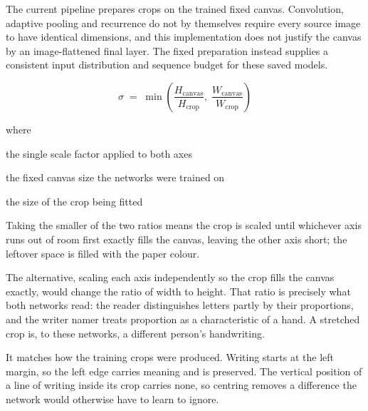 The current pipeline prepares crops on the trained fixed canvas. Convolution, adaptive pooling and recurrence do not by themselves require every source image to have identical dimensions, and this implementation does not justify the canvas by an image-flattened final layer. The fixed preparation instead supplies a consistent input distribution and sequence budget for these saved models.



\begin{equation}
\sigma \;=\; \min\!\left(\frac{H_{\mathrm{canvas}}}{H_{\mathrm{crop}}},\; \frac{W_{\mathrm{canvas}}}{W_{\mathrm{crop}}}\right)
\end{equation}

\noindent where
\begin{description}[leftmargin=2.4em,style=nextline,font=\normalfont\ttfamily]\setlength\itemsep{1pt}
  \item[{$\sigma$}] \normalfont the single scale factor applied to both axes
  \item[{$H_{\mathrm{canvas}},\, W_{\mathrm{canvas}}$}] \normalfont the fixed canvas size the networks were trained on
  \item[{$H_{\mathrm{crop}},\, W_{\mathrm{crop}}$}] \normalfont the size of the crop being fitted
\end{description}
Taking the smaller of the two ratios means the crop is scaled until whichever axis runs out of room first exactly fills the canvas, leaving the other axis short; the leftover space is filled with the paper colour.

The alternative, scaling each axis independently so the crop fills the canvas exactly, would change the ratio of width to height. That ratio is precisely what both networks read: the reader distinguishes letters partly by their proportions, and the writer namer treats proportion as a characteristic of a hand. A stretched crop is, to these networks, a different person's handwriting.


It matches how the training crops were produced. Writing starts at the left margin, so the left edge carries meaning and is preserved. The vertical position of a line of writing inside its crop carries none, so centring removes a difference the network would otherwise have to learn to ignore.



